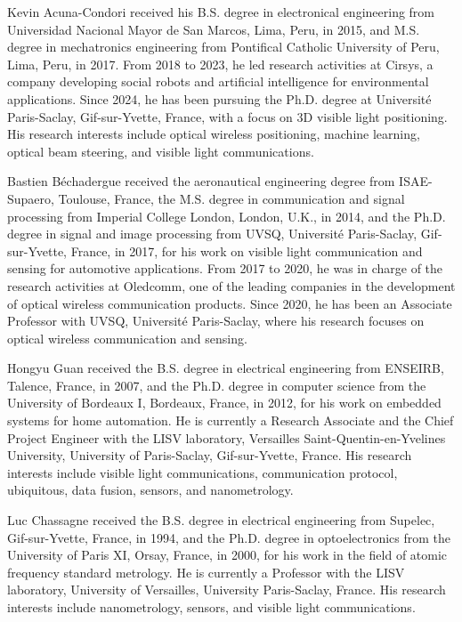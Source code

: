 \documentclass[journal]{IEEEtran}
\begin{document}
\begin{IEEEbiographynophoto}{Kevin Acuna-Condori}
received his B.S. degree in electronical engineering from Universidad Nacional Mayor de San Marcos, Lima, Peru, in 2015, and M.S. degree in mechatronics engineering from Pontifical Catholic University of Peru, Lima, Peru, in 2017. 
From 2018 to 2023, he led research activities at Cirsys, a company developing social robots and artificial intelligence for environmental applications.
Since 2024, he has been pursuing the Ph.D. degree at Université Paris-Saclay, Gif-sur-Yvette, France, with a focus on 3D visible light positioning.
His research interests include optical wireless positioning, machine learning, optical beam steering, and visible light communications.
\end{IEEEbiographynophoto}

\begin{IEEEbiographynophoto}{Bastien Béchadergue}
received the aeronautical engineering degree from ISAE-Supaero, Toulouse, France, the M.S. degree in communication and signal processing from Imperial College London, London, U.K., in 2014, and the Ph.D. degree in signal and image processing from UVSQ, Université Paris-Saclay, Gif-sur-Yvette, France, in 2017, for his work on visible light communication and sensing for automotive applications. From 2017 to 2020, he was in charge of the research activities at Oledcomm, one of the leading companies in the development of optical wireless communication products. Since 2020, he has been an Associate Professor with UVSQ, Université Paris-Saclay, where his research focuses on optical wireless communication and sensing.
\end{IEEEbiographynophoto}

\begin{IEEEbiographynophoto}{Hongyu Guan}
received the B.S. degree in electrical engineering from ENSEIRB, Talence, France, in 2007, and the Ph.D. degree in computer science from the University of Bordeaux I, Bordeaux, France, in 2012, for his work on embedded systems for home automation. He is currently a Research Associate and the Chief Project Engineer with the LISV laboratory, Versailles Saint-Quentin-en-Yvelines University, University of Paris-Saclay, Gif-sur-Yvette, France. His research interests include visible light communications, communication protocol, ubiquitous, data fusion, sensors, and nanometrology.
\end{IEEEbiographynophoto}

\begin{IEEEbiographynophoto}{Luc Chassagne}
received the B.S. degree in electrical engineering from Supelec, Gif-sur-Yvette, France, in 1994, and the Ph.D. degree in optoelectronics from the University of Paris XI, Orsay, France, in 2000, for his work in the field of atomic frequency standard metrology. He is currently a Professor with the LISV laboratory, University of Versailles, University Paris-Saclay, France. His research interests include nanometrology, sensors, and visible light communications.
\end{IEEEbiographynophoto}
\end{document}
